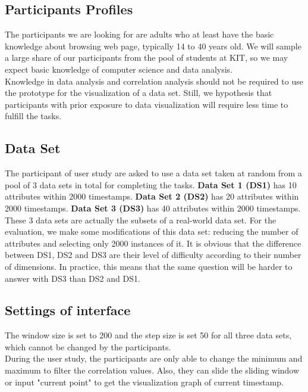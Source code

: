\subsection{Participants Profiles}
\label{sec:Evaluation:ExperimentalSettings:PP}
The participants we are looking for are adults who at least have the basic knowledge about browsing web page, typically 14 to 40 years old. We will sample a large share of our participants from the pool of students at KIT, so we may expect basic knowledge of computer science and data analysis.\\
Knowledge in data analysis and correlation analysis should not be required to use the prototype for the visualization of a data set. Still, we hypothesis that participants with prior exposure to data visualization will require less time to fulfill the tasks.\\

\subsection{Data Set}
\label{sec:Evaluation:ExperimentalSettings:DataSet}
The participant of user study are asked to use a data set taken at random from a pool of 3 data sets in total for completing the tasks. \textbf{Data Set 1 (DS1)} has 10 attributes within 2000 timestamps. \textbf{Data Set 2 (DS2)} has 20 attributes within 2000 timestamps. \textbf{Data Set 3 (DS3)} has 40 attributes within 2000 timestamps. These 3 data sets are actually the subsets of a real-world data set. For the evaluation, we make some modifications of this data set: reducing the number of attributes and selecting only 2000 instances of it. It is obvious that the difference between DS1, DS2 and DS3 are their level of difficulty according to their number of dimensions. In practice, this means that the same question will be harder to answer with DS3 than DS2 and DS1.\\

\subsection{Settings of interface}
The window size is set to 200 and the step size is set 50 for all three data sets, which cannot be changed by the participants.\\
During the user study, the participants are only able to change the minimum and maximum to filter the correlation values. Also, they can slide the sliding window or input "current point" to get the visualization graph of current timestamp.

